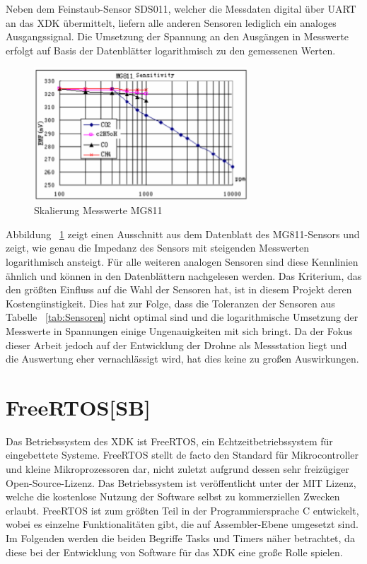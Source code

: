 Neben dem Feinstaub-Sensor SDS011, welcher die Messdaten digital über \acs{UART} an das \acs{XDK} übermittelt, liefern alle anderen Sensoren lediglich ein analoges Ausgangssignal. Die Umsetzung der Spannung an den Ausgängen in Messwerte erfolgt auf Basis der Datenblätter logarithmisch zu den gemessenen Werten. \newline
\begin{figure}[H]
	\centering
	\includegraphics[width=8cm]{images/MG811_Skalierung.png}	
	\caption{Skalierung Messwerte MG811}
	\label{fig:MG811_Skalierung}
\end{figure}
Abbildung ~\ref{fig:MG811_Skalierung} zeigt einen Ausschnitt aus dem Datenblatt des MG811-Sensors und zeigt, wie genau die Impedanz des Sensors mit steigenden Messwerten logarithmisch ansteigt. Für alle weiteren analogen Sensoren sind diese Kennlinien ähnlich und können in den Datenblättern nachgelesen werden.
\newline \newline 
Das Kriterium, das den größten Einfluss auf die Wahl der Sensoren hat, ist in diesem Projekt deren Kostengünstigkeit.
\newline
Dies hat zur Folge, dass die Toleranzen der Sensoren aus Tabelle ~\ref{tab:Sensoren} nicht optimal sind und die logarithmische Umsetzung der Messwerte in Spannungen einige Ungenauigkeiten mit sich bringt. \newline
Da der Fokus dieser Arbeit jedoch auf der Entwicklung der Drohne als Messstation liegt und die Auswertung eher vernachlässigt wird, hat dies keine zu großen Auswirkungen.
\section{FreeRTOS[SB]}\label{sec:FreeRTOS}
Das Betriebssystem des \acs*{XDK} ist FreeRTOS, ein Echtzeitbetriebssystem für eingebettete Systeme. FreeRTOS stellt de facto den Standard für Mikrocontroller und kleine Mikroprozessoren dar, nicht zuletzt aufgrund dessen sehr freizügiger Open-Source-Lizenz. Das Betriebssystem ist veröffentlicht unter der MIT Lizenz, welche die kostenlose Nutzung der Software selbst zu kommerziellen Zwecken erlaubt. FreeRTOS ist zum größten Teil in der Programmiersprache C entwickelt, wobei es einzelne Funktionalitäten gibt, die auf Assembler-Ebene umgesetzt sind. Im Folgenden werden die beiden Begriffe Tasks und Timers näher betrachtet, da diese bei der Entwicklung von Software für das \acs*{XDK} eine große Rolle spielen.
